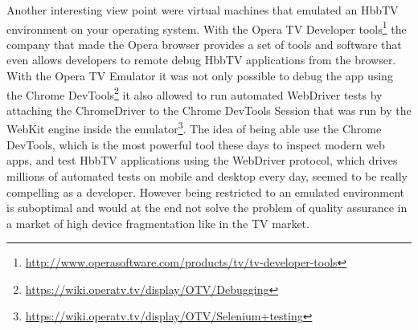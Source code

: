 Another interesting view point were virtual machines that emulated an HbbTV environment on your operating system.
With the Opera TV Developer tools\footnote{\url{http://www.operasoftware.com/products/tv/tv-developer-tools}} the
company that made the Opera browser provides a set of tools and software that even allows developers to remote debug
HbbTV applications from the browser. With the Opera TV Emulator it was not only possible to debug the app using
the Chrome DevTools\footnote{\url{https://wiki.operatv.tv/display/OTV/Debugging}} it also allowed to run automated
WebDriver tests by attaching the ChromeDriver to the Chrome DevTools Session that was run by the WebKit engine inside
the emulator\footnote{\url{https://wiki.operatv.tv/display/OTV/Selenium+testing}}. The idea of being able use the
Chrome DevTools, which is the most powerful tool these days to inspect modern web apps, and test HbbTV applications
using the WebDriver protocol, which drives millions of automated tests on mobile and desktop every day, seemed to be
really compelling as a developer. However being restricted to an emulated environment is suboptimal and would at the
end not solve the problem of quality assurance in a market of high device fragmentation like in the TV market.

